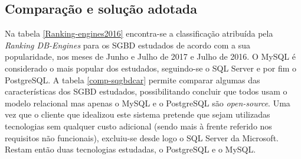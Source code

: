 


\subsection{Comparação e solução adotada}




Na tabela \ref{Ranking-engines2016} encontra-se a classificação atribuída pela \textit{Ranking DB-Engines} para os \ac{SGBD} estudados de acordo com a sua popularidade, nos meses de Junho e Julho de 2017 e Julho de 2016\cite{DB-engines2016}. O MySQL é considerado o mais popular dos estudados, seguindo-se o SQL Server e por fim o PostgreSQL. A tabela \ref{comp-sqgbdcar} permite comparar algumas das características dos \ac{SGBD} estudados, possibilitando concluir que todos usam o modelo relacional mas apenas o MySQL e o PostgreSQL são \textit{open-source}. Uma vez que o cliente que idealizou este sistema pretende que sejam utilizadas tecnologias sem qualquer custo adicional (sendo mais à frente referido nos requisitos não funcionais), excluiu-se  desde logo o SQL Server da Microsoft. Restam então duas tecnologias estudadas, o PostgreSQL e o MySQL.



